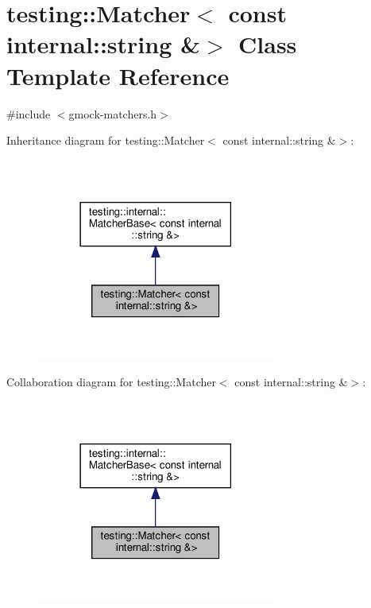 \hypertarget{classtesting_1_1_matcher_3_01const_01internal_1_1string_01_6_4}{}\section{testing\+:\+:Matcher$<$ const internal\+:\+:string \&$>$ Class Template Reference}
\label{classtesting_1_1_matcher_3_01const_01internal_1_1string_01_6_4}


{\ttfamily \#include $<$gmock-\/matchers.\+h$>$}



Inheritance diagram for testing\+:\+:Matcher$<$ const internal\+:\+:string \&$>$\+:
\nopagebreak
\begin{figure}[H]
\begin{center}
\leavevmode
\includegraphics[width=222pt]{classtesting_1_1_matcher_3_01const_01internal_1_1string_01_6_4__inherit__graph}
\end{center}
\end{figure}


Collaboration diagram for testing\+:\+:Matcher$<$ const internal\+:\+:string \&$>$\+:
\nopagebreak
\begin{figure}[H]
\begin{center}
\leavevmode
\includegraphics[width=222pt]{classtesting_1_1_matcher_3_01const_01internal_1_1string_01_6_4__coll__graph}
\end{center}
\end{figure}
